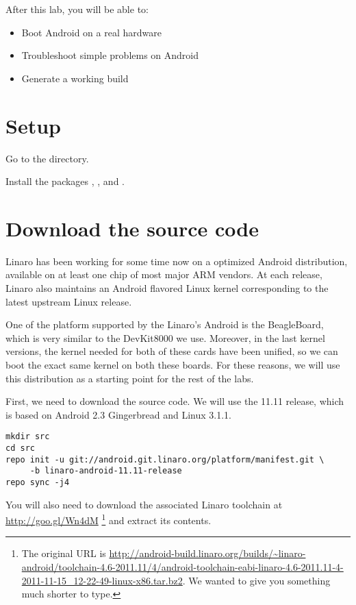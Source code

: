
After this lab, you will be able to:
\begin{itemize}
  \item Boot Android on a real hardware
  \item Troubleshoot simple problems on Android
  \item Generate a working build
\end{itemize}

\section{Setup}

Go to the  directory.

Install the packages , ,
 and .

\section{Download the source code}

Linaro has been working for some time now on a optimized Android distribution,
available on at least one chip of most major ARM vendors. At each release,
Linaro also maintains an Android flavored Linux kernel corresponding to the latest
upstream Linux release.

One of the platform supported by the Linaro's Android is the BeagleBoard, which
is very similar to the DevKit8000 we use. Moreover, in the last kernel versions,
the kernel needed for both of these cards have been unified, so we can boot the
exact same kernel on both these boards. For these reasons, we will use this
distribution as a starting point for the rest of the labs.

First, we need to download the source code. We will use the 11.11 release, which
is based on Android 2.3 Gingerbread and Linux 3.1.1.

\begin{verbatim}
mkdir src
cd src
repo init -u git://android.git.linaro.org/platform/manifest.git \
     -b linaro-android-11.11-release
repo sync -j4
\end{verbatim}

You will also need to download the associated Linaro toolchain at
\url{http://goo.gl/Wn4dM}
\footnote{The original URL is
\url{http://android-build.linaro.org/builds/~linaro-android/toolchain-4.6-2011.11/4/android-toolchain-eabi-linaro-4.6-2011.11-4-2011-11-15_12-22-49-linux-x86.tar.bz2}. We wanted to give you something much shorter
to type.} and extract its contents.

